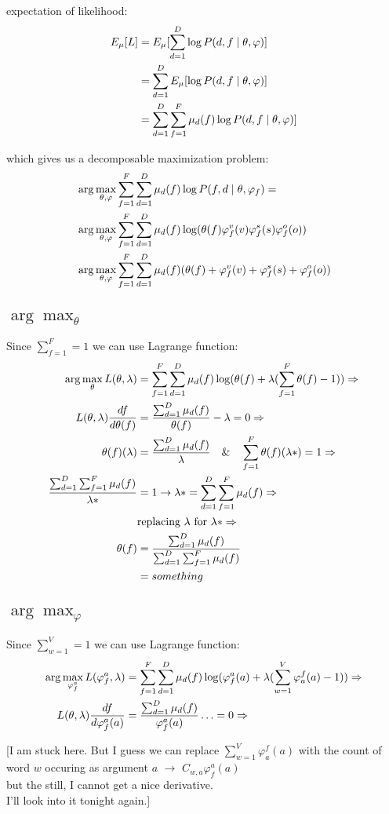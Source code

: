 \documentclass[a4-paper]{article}
\newcommand{\vp}{\ensuremath{\varphi}}
\begin{document}
expectation of likelihood:
\begin{align}
  E_\mu[L] &= E_\mu[\sum_{d=1}^D\log P(d,f\mid\theta,\vp)]\notag\\
  &=\sum_{d=1}^DE_\mu[\log P(d,f\mid\theta,\vp)]\notag\\
  &=\sum_{d=1}^D\sum_{f=1}^F\mu_d(f)\log P(d,f\mid\theta,\vp)]
\end{align}
  

which gives us a decomposable maximization problem:
\begin{align}  
  &\arg\max_{\theta,\vp} \sum_{f=1}^F\sum_{d=1}^D \mu_d(f)\log P(f,d\mid\theta,\vp_f) = \notag\\
  &\arg\max_{\theta,\vp} \sum_{f=1}^F\sum_{d=1}^D \mu_d(f)\log(\theta(f)\vp^v_f(v)\vp^s_f(s)\vp^o_f(o))\notag\\
  &\arg\max_{\theta,\vp} \sum_{f=1}^F\sum_{d=1}^D \mu_d(f)(\theta(f)+\vp^v_f(v)+\vp^s_f(s)+\vp^o_f(o))
\end{align}

\subsection{$\arg\max_\theta$}
Since $\sum_{f=1}^F = 1$ we can use Lagrange function:
\begin{align}
  \arg\max_\theta L(\theta,\lambda) & = \sum_{f=1}^F\sum_{d=1}^D \mu_d(f)\log(\theta(f)+\lambda(\sum_{f=1}^F\theta(f) -1 )) \Rightarrow \notag\\
  L(\theta,\lambda)\frac{df}{d\theta(f)} & = \frac{\sum_{d=1}^D\mu_d(f)}{\theta(f)}-\lambda = 0 \Rightarrow \notag\\
  \theta(f)(\lambda) &= \frac{\sum_{d=1}^D\mu_d(f)}{\lambda}\quad\&\quad \sum_{f=1}^F\theta(f)(\lambda*) = 1 \Rightarrow \notag\\
  \frac{\sum_{d=1}^D\sum_{f=1}^F\mu_d(f)}{\lambda *} &= 1 \rightarrow \lambda *=\sum_{d=1}^D\sum_{f=1}^F\mu_d(f)  \Rightarrow \notag\\
    & \text{replacing } \lambda \text{ for } \lambda* \Rightarrow \notag\\
    \theta(f) &= \frac{\sum_{d=1}^D\mu_d(f)}{\sum_{d=1}^D\sum_{f=1}^F\mu_d(f)} \notag\\
    &= something
\end{align}

\subsection{$\arg\max_\vp$}
Since $\sum_{w=1}^V = 1$ we can use Lagrange function:
\begin{align}
  \arg\max_{\vp^a_f} L(\vp^a_f,\lambda) & = \sum_{f=1}^F\sum_{d=1}^D \mu_d(f)\log(\vp^a_f(a)+\lambda(\sum_{w=1}^V\vp_a^f(a) -1 )) \Rightarrow \notag\\
  L(\theta,\lambda)\frac{df}{d\vp_f^a(a)} & = \frac{\sum_{d=1}^D\mu_d(f)}{\vp_f^a(a)}\ldots = 0 \Rightarrow \notag
\end{align}

[I am stuck here. But I guess we can replace $\sum_{w=1}^V\vp_a^f(a)$ with the count of word $w$ occuring as argument $a$ $\rightarrow$ $C_{w,a}\vp^a_f(a)$ \\ but the still, I cannot get a nice derivative.\\
I'll look into it tonight again.]
\end{document}
